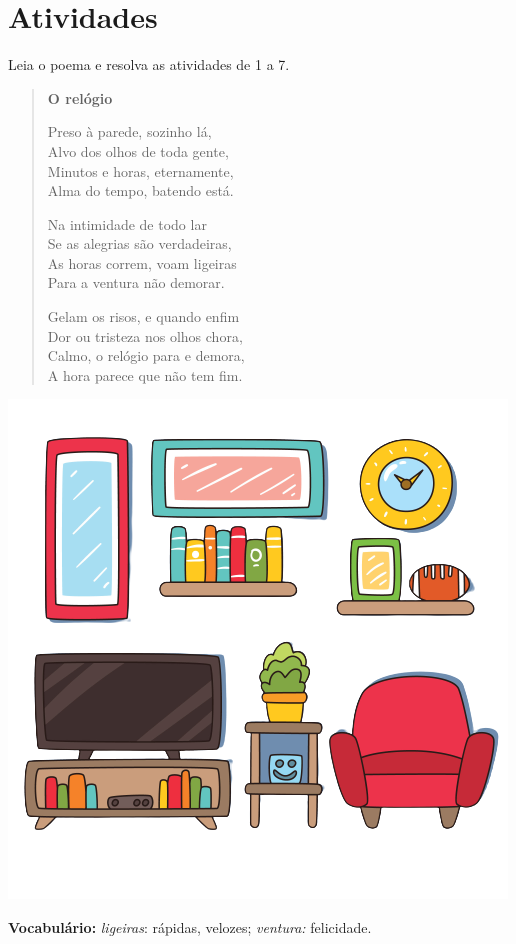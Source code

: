 \section*{Atividades}

Leia o poema e resolva as atividades de 1 a 7.



\begin{myquote}
\begin{verse}
\textbf{O relógio}

Preso à parede, sozinho lá,\\
Alvo dos olhos de toda gente,\\
Minutos e horas, eternamente,\\
Alma do tempo, batendo está.

Na intimidade de todo lar\\
Se as alegrias são verdadeiras,\\
As horas correm, voam ligeiras\\
Para a ventura não demorar.

Gelam os risos, e quando enfim\\
Dor ou tristeza nos olhos chora,\\
Calmo, o relógio para e demora,\\
A hora parece que não tem fim.
\end{verse}

\includegraphics[width=.6\textwidth]{./media/image14a.png}


\begin{small}
\textbf{Vocabulário:} \textit{ligeiras}: rápidas, velozes; \textit{ventura:} felicidade.
\end{small}
\end{myquote}

